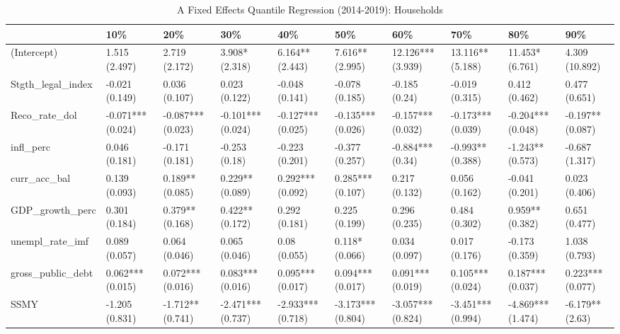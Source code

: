 \begin{table}[ht]
\centering
\caption{A Fixed Effects Quantile Regression (2014-2019): Households} 
\begingroup\small
\begin{tabular}{llllllllll}
  \toprule
 & 10\% & 20\% & 30\% & 40\% & 50\% & 60\% & 70\% & 80\% & 90\% \\ 
  \midrule
(Intercept) & 1.515 (2.497) & 2.719 (2.172) & 3.908* (2.318) & 6.164** (2.443) & 7.616** (2.995) & 12.126*** (3.939) & 13.116** (5.188) & 11.453* (6.761) & 4.309 (10.892) \\ 
  Stgth\_legal\_index & -0.021 (0.149) & 0.036 (0.107) & 0.023 (0.122) & -0.048 (0.141) & -0.078 (0.185) & -0.185 (0.24) & -0.019 (0.315) & 0.412 (0.462) & 0.477 (0.651) \\ 
  Reco\_rate\_dol & -0.071*** (0.024) & -0.087*** (0.023) & -0.101*** (0.024) & -0.127*** (0.025) & -0.135*** (0.026) & -0.157*** (0.032) & -0.173*** (0.039) & -0.204*** (0.048) & -0.197** (0.087) \\ 
  infl\_perc & 0.046 (0.181) & -0.171 (0.181) & -0.253 (0.18) & -0.223 (0.201) & -0.377 (0.257) & -0.884*** (0.34) & -0.993** (0.388) & -1.243** (0.573) & -0.687 (1.317) \\ 
  curr\_acc\_bal & 0.139 (0.093) & 0.189** (0.085) & 0.229** (0.089) & 0.292*** (0.092) & 0.285*** (0.107) & 0.217 (0.132) & 0.056 (0.162) & -0.041 (0.201) & 0.023 (0.406) \\ 
  GDP\_growth\_perc & 0.301 (0.184) & 0.379** (0.168) & 0.422** (0.172) & 0.292 (0.181) & 0.225 (0.199) & 0.296 (0.235) & 0.484 (0.302) & 0.959** (0.382) & 0.651 (0.477) \\ 
  unempl\_rate\_imf & 0.089 (0.057) & 0.064 (0.046) & 0.065 (0.046) & 0.08 (0.055) & 0.118* (0.066) & 0.034 (0.097) & 0.017 (0.176) & -0.173 (0.359) & 1.038 (0.793) \\ 
  gross\_public\_debt & 0.062*** (0.015) & 0.072*** (0.016) & 0.083*** (0.016) & 0.095*** (0.017) & 0.094*** (0.017) & 0.091*** (0.019) & 0.105*** (0.024) & 0.187*** (0.037) & 0.223*** (0.077) \\ 
  SSMY & -1.205 (0.831) & -1.712** (0.741) & -2.471*** (0.737) & -2.933*** (0.718) & -3.173*** (0.804) & -3.057*** (0.824) & -3.451*** (0.994) & -4.869*** (1.474) & -6.179** (2.63) \\ 
   \bottomrule
\end{tabular}
\endgroup
\end{table}
